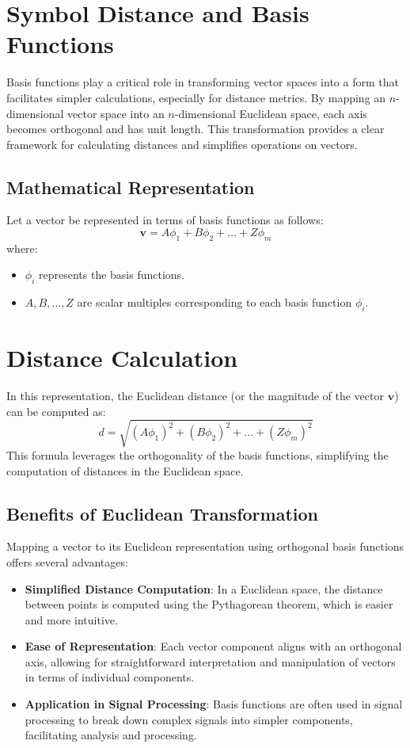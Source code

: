 \documentclass[10pt]{article}
\begin{document}
\section{Symbol Distance and Basis Functions}
Basis functions play a critical role in transforming vector spaces into a form that facilitates simpler calculations, especially for distance metrics. By mapping an $n$-dimensional vector space into an $n$-dimensional Euclidean space, each axis becomes orthogonal and has unit length. This transformation provides a clear framework for calculating distances and simplifies operations on vectors.

\subsection{Mathematical Representation}

Let a vector be represented in terms of basis functions as follows:
\[
\mathbf{v} = A \phi_1 + B \phi_2 + \ldots + Z \phi_m
\]
where:
\begin{itemize}
    \item \( \phi_i \) represents the basis functions.
    \item \( A, B, \ldots, Z \) are scalar multiples corresponding to each basis function \( \phi_i \).
\end{itemize}

\section{Distance Calculation}
In this representation, the Euclidean distance (or the magnitude of the vector \( \mathbf{v} \)) can be computed as:
\[
d = \sqrt{(A \phi_1)^2 + (B \phi_2)^2 + \ldots + (Z \phi_m)^2}
\]
This formula leverages the orthogonality of the basis functions, simplifying the computation of distances in the Euclidean space.

\subsection{Benefits of Euclidean Transformation}
Mapping a vector to its Euclidean representation using orthogonal basis functions offers several advantages:
\begin{itemize}
    \item \textbf{Simplified Distance Computation}: In a Euclidean space, the distance between points is computed using the Pythagorean theorem, which is easier and more intuitive.
    \item \textbf{Ease of Representation}: Each vector component aligns with an orthogonal axis, allowing for straightforward interpretation and manipulation of vectors in terms of individual components.
    \item \textbf{Application in Signal Processing}: Basis functions are often used in signal processing to break down complex signals into simpler components, facilitating analysis and processing.
\end{itemize}
\end{document}
